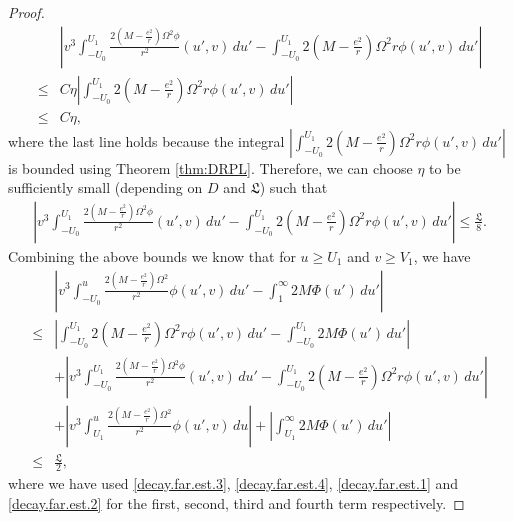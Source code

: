 \documentclass[12 pt, reqno]{amsart}
\theoremstyle{definition}
\theoremstyle{remark}
\numberwithin{equation}{section}
\newcommand{\0}{\emptyset}
\newcommand{\Omg}{\Omega}
\newcommand{\f}{\frac}
\begin{document}
\begin{proof}
\begin{equation*}
\begin{split}
&|v^3\int_{-U_0}^{U_1} \f{2(M-\f{e^2}{r})\Omg^2\phi}{r^2}(u',v)\,du'-\int_{-U_0}^{U_1} 2(M-\f{e^2}{r})\Omg^2 r \phi(u',v)\,du'|\\
\leq &C\eta |\int_{-U_0}^{U_1} 2(M-\f{e^2}{r})\Omg^2 r \phi(u',v)\,du'|\\
\leq &C\eta,
\end{split}
\end{equation*}
where the last line holds because the integral $|\int_{-U_0}^{U_1} 2(M-\f{e^2}{r})\Omg^2 r \phi(u',v)\,du'|$ is bounded using Theorem \ref{thm:DRPL}. Therefore, we can choose $\eta$ to be sufficiently small (depending on $D$ and $\mathfrak L$) such that 
\begin{equation}\label{decay.far.est.4}
\begin{split}
|v^3\int_{-U_0}^{U_1} \f{2(M-\f{e^2}{r})\Omg^2\phi}{r^2}(u',v)\,du'-\int_{-U_0}^{U_1} 2(M-\f{e^2}{r})\Omg^2 r \phi(u',v)\,du'|\leq \f{\mathfrak L}{8}.
\end{split}
\end{equation}
Combining the above bounds we know that for $u\geq U_1$ and $v\geq V_1$, we have
\begin{equation}\label{decay.far.1}
\begin{split}
&|v^3\int_{-U_0}^u \f{2(M-\f{e^2}{r})\Omg^2}{r^2} \phi (u',v)\,du'-\int_1^\infty 2M \Phi(u')  \,du'|\\
\leq &|\int_{-U_0}^{U_1} 2(M-\f{e^2}{r})\Omg^2 r \phi(u',v)\,du'-\int_{-U_0}^{U_1} 2M \Phi(u')  \,du'|\\
&+|v^3\int_{-U_0}^{U_1} \f{2(M-\f{e^2}{r})\Omg^2\phi}{r^2}(u',v)\,du'-\int_{-U_0}^{U_1} 2(M-\f{e^2}{r})\Omg^2 r \phi(u',v)\,du'|\\
&+|v^3\int_{U_1}^u \f{2(M-\f{e^2}{r})\Omg^2}{r^2} \phi (u',v)\,du|+|\int_{U_1}^\infty 2M \Phi(u')  \,du'|\\
\leq &\f{\mathfrak L}{2},
\end{split}
\end{equation}
where we have used \eqref{decay.far.est.3}, \eqref{decay.far.est.4}, \eqref{decay.far.est.1} and \eqref{decay.far.est.2} for the first, second, third and fourth term respectively.


\end{proof}
\end{document}
